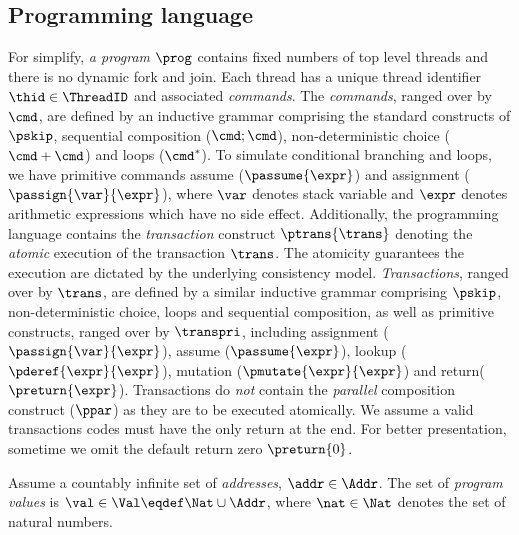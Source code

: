 \subsection{Programming language}

For simplify, \emph{a program} \( \prog \) contains fixed numbers of top level threads and there is no dynamic fork and join.
Each thread has a unique thread identifier \( \thid \in \ThreadID \) and associated \emph{commands}.
The \emph{commands}, ranged over by $\cmd$, are defined by an inductive grammar comprising the standard constructs of $\pskip$, sequential composition ($\cmd; \cmd$), non-deterministic choice ($\cmd+\cmd$) and loops ($\cmd^*$).
To simulate conditional branching and loops, we have primitive commands assume (\( \passume{\expr}\)) and assignment (\( \passign{\var}{\expr} \)), where \( \var \) denotes stack variable and \( \expr \) denotes arithmetic expressions which have no side effect.
Additionally, the programming language contains the \emph{transaction} construct $\ptrans{\trans}$ denoting the \emph{atomic} execution of the transaction $\trans$. 
The atomicity guarantees the execution are dictated by the underlying consistency model.
\emph{Transactions}, ranged over by $\trans$, are defined by a similar inductive grammar comprising $\pskip$, non-deterministic choice, loops and sequential composition, as well as primitive constructs, ranged over by \( \transpri \), including assignment (\( \passign{\var}{\expr}\)), assume (\( \passume{\expr}\)), lookup (\( \pderef{\expr}{\expr}\)), mutation (\( \pmutate{\expr}{\expr}\)) and return(\( \preturn{\expr}\)). 
Transactions do \emph{not} contain the \emph{parallel} composition construct ($\ppar$) as they are to be executed atomically.
We assume a valid transactions codes must have the only return at the end.
For better presentation, sometime we omit the default return zero \( \preturn{0} \).

\begin{defn}
\label{def:program_values}
Assume a countably infinite set of \emph{addresses}, $\addr \in \Addr$. The set of \emph{program values} is $\val \in \Val \eqdef \Nat \cup \Addr$, where $ \nat \in \Nat$ denotes the set of natural numbers.
\end{defn}

